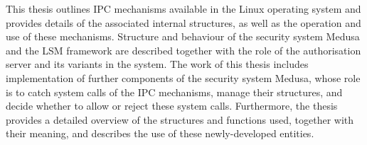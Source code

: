 This thesis outlines IPC mechanisms available in the Linux operating system and provides details of the associated internal structures, as well as the operation and use of these mechanisms. Structure and behaviour of the security system Medusa and the LSM framework are described together with the role of the authorisation server and its variants in the system. The work of this thesis includes implementation of further components of the security system Medusa, whose role is to catch system calls of the IPC mechanisms, manage their structures, and decide whether to allow or reject these system calls. Furthermore, the thesis provides a detailed overview of the structures and functions used, together with their meaning, and describes the use of these newly-developed entities.